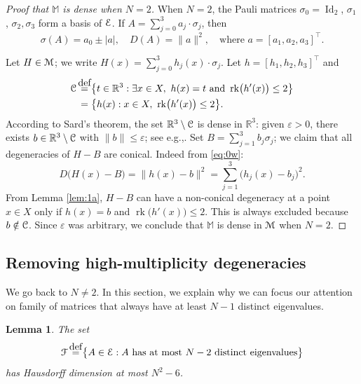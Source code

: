 \documentclass[11pt]{article}
\newcommand{\eg}{e.g.,\xspace}
\numberwithin{equation}{section}
\let\pazocal\EuScript
\let\sep:
\newtheorem{lem}{Lemma}[section]
\theoremstyle{definition}
\DeclareMathOperator{\Id}{Id}
\DeclareMathOperator{\rk}{rk}
\newcommand{\FF}{\pazocal{F}}
\newcommand{\CC}{\pazocal{C}}
\newcommand{\EE}{\pazocal{E}}
\newcommand{\MM}{\pazocal{M}}
\newcommand{\R}{\mathbb{R}}
\newcommand{\Mm}{\mathbb{M}}
\let\epsi\varepsilon
\newcommand{\de}{\,\mathrel{\stackrel{\makebox[0pt]{\mbox{\normalfont\tiny def}}}{=}}}
\begin{document}
\begin{proof}[Proof that $\Mm$ is dense when $N=2$] When $N=2$, the Pauli matrices $\sigma_0 = \Id_2$, $\sigma_1$, $\sigma_2, \sigma_3$ form a basis of $\EE$. If $A = \sum_{j=0}^3 a_j \cdot \sigma_j$, then
\begin{equation}\label{eq:0w}
\sigma(A) = a_0 \pm |a|, \quad D(A) = \| a \|^2, \quad \text{where } a = [a_1,a_2,a_3]^\top.
\end{equation}

Let $H \in \MM$; we write $H(x) = \sum_{j=0}^3 h_j(x) \cdot \sigma_j$.
Let $h = [h_1,h_2,h_3]^\top$ and
\begin{align*}
\CC &\de \bigl\{ t \in \R^3\sep \exists x \in X, \ h(x) = t \text{ and } \rk \bigl(h'(x)\bigr) \leq 2 \bigr\} \\
&\,=
\bigl\{ h(x)\sep x \in X, \ \rk \bigl(h'(x)\bigr) \leq 2 \bigr\}.
\end{align*}
According to Sard's theorem, the set $\R^3 \setminus \CC$ is dense in $\R^3$: given $\epsi > 0$, there exists $b \in \R^3 \setminus \CC$ with $\| b \| \leq \epsi$; see \eg \cite[\S1.7]{GP74}. Set $B = \sum_{j=1}^3 b_j \sigma_j$; we claim that all degeneracies of $H-B$ are conical. Indeed from \eqref{eq:0w}:
\begin{equation*}
D\bigl(H(x) - B\bigr) = \big\| h(x) - b \big\|^2 = \sum_{j=1}^3 \bigl( h_j(x) -b_j \bigr)^2.
\end{equation*}
From Lemma \ref{lem:1a}, $H-B$ can have a non-conical degeneracy at a point $x \in X$ only if $h(x) = b$ and $\rk \bigl(h'(x)\bigr) \leq 2$. This is always excluded because $b \notin \CC$. Since $\epsi$ was arbitrary, we conclude that $\Mm$ is dense in $\MM$ when $N=2$. \end{proof}

\subsection{Removing high-multiplicity degeneracies}\label{sec:3.2} We go back to $N \neq 2$. In this section, we explain why we can focus our attention on family of matrices that always have at least $N-1$ distinct eigenvalues.

\begin{lem}\label{lem:1d} The set
\begin{equation*}
\FF \de \bigl\{ A \in \EE \sep A \text{ has at most $N-2$ distinct eigenvalues} \bigr\}
\end{equation*}
has Hausdorff dimension at most $N^2-6$.
\end{lem}
\end{document}
